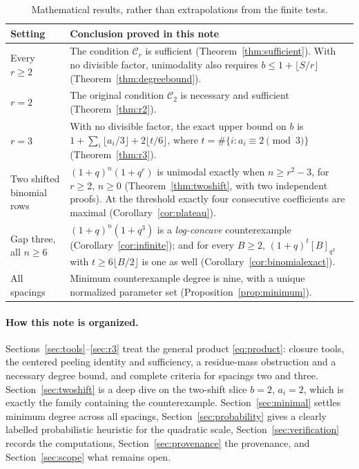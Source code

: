\documentclass[11pt]{article}
\theoremstyle{research}
\theoremstyle{definition}
\newcommand{\qir}[2]{[#1]_{q^{#2}}}
\numberwithin{equation}{section}
\begin{document}
\begin{table}[htbp]
\centering
\small
\begin{tabular}{@{}p{.25\linewidth}p{.64\linewidth}@{}}
\toprule
Setting & Conclusion proved in this note \\
\midrule
Every $r\ge2$ & The condition $\mathcal C_r$ is sufficient
(Theorem~\ref{thm:sufficient}). With no divisible
factor, unimodality also requires $b\le1+\lfloor S/r\rfloor$
(Theorem~\ref{thm:degreebound}). \\
$r=2$ & The original condition $\mathcal C_2$ is necessary and sufficient
(Theorem~\ref{thm:r2}). \\
$r=3$ & With no divisible factor, the exact upper bound on $b$ is
$1+\sum_i\lfloor a_i/3\rfloor+2\lfloor t/6\rfloor$,
where $t=\#\{i:a_i\equiv2\pmod3\}$ (Theorem~\ref{thm:r3}). \\
Two shifted binomial rows & $(1+q)^n(1+q^r)$ is unimodal exactly when
$n\ge r^2-3$, for $r\ge2$, $n\ge0$ (Theorem~\ref{thm:twoshift}, with two
independent proofs). At the threshold exactly four consecutive coefficients
are maximal (Corollary~\ref{cor:plateau}). \\
Gap three, all $n\ge6$ & $(1+q)^n(1+q^3)$ is a \emph{log-concave}
counterexample (Corollary~\ref{cor:infinite}); and for every $B\ge2$,
$(1+q)^t\qir B3$ with $t\ge6\lfloor B/2\rfloor$ is one as well
(Corollary~\ref{cor:binomialexact}). \\
All spacings & Minimum counterexample degree is nine, with a unique
normalized parameter set (Proposition~\ref{prop:minimum}). \\
\bottomrule
\end{tabular}
\caption{Mathematical results, rather than extrapolations from the finite tests.}
\label{tab:results}
\end{table}

\paragraph{How this note is organized.}
Sections~\ref{sec:tools}--\ref{sec:r3} treat the general product
\eqref{eq:product}: closure tools, the centered peeling identity and
sufficiency, a residue-mass obstruction and a necessary degree bound, and
complete criteria for spacings two and three.
Section~\ref{sec:twoshift} is a deep dive on the two-shift slice
$b=2$, $a_i=2$, which is exactly the family containing the counterexample.
Section~\ref{sec:minimal} settles minimum degree across all spacings,
Section~\ref{sec:probability} gives a clearly labelled probabilistic
heuristic for the quadratic scale, Section~\ref{sec:verification} records
the computations, Section~\ref{sec:provenance} the provenance, and
Section~\ref{sec:scope} what remains open.
\end{document}
